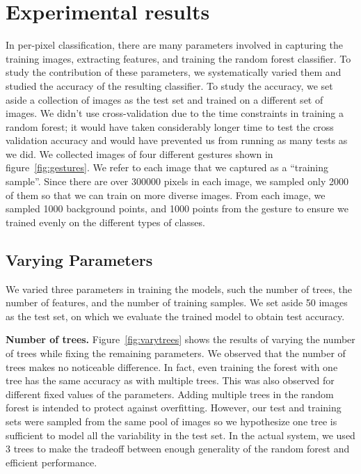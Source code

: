 \section{Experimental results}
\cutsection
\label{sec: experiments}

In per-pixel classification, there are many parameters involved in capturing the training images, extracting features, and training the random forest classifier. To study the contribution of these parameters, we systematically varied them and studied the accuracy of the resulting classifier. To study the accuracy, we set aside a collection of images as the test set and trained on a different set of images. We didn't use cross-validation due to the time constraints in training a random forest; it would have taken considerably longer time to test the cross validation accuracy and would  have prevented us from running as many tests as we did.
We collected images of four different gestures shown in figure~\ref{fig:gestures}. We refer to each image that we captured as a ``training sample''. Since there are over 300000 pixels in each image, we sampled only 2000 of them so that we can train on more diverse images. From each image, we sampled 1000 background points, and 1000 points from the gesture to ensure we trained evenly on the different types of classes.
\cutsubsection
\subsection{Varying Parameters} 
\cutsubsection
We varied three parameters in training the models, such the number of trees, the number of features, and the number of training samples. We set aside 50 images as the test set, on which we evaluate the trained model to obtain test accuracy. 
\cutequation

\textbf{Number of trees.} Figure~\ref{fig:varytrees} shows the results of varying the number of trees while fixing the remaining parameters. We observed that the number of trees makes no noticeable difference. In fact, even training the forest with one tree has the same accuracy as with multiple trees. This was also observed for different fixed values of the parameters. Adding multiple trees in the random forest is intended to protect against overfitting. However, our test and training sets were sampled from the same pool of images so we hypothesize one tree is sufficient to model all the variability in the test set. In the actual system, we used 3 trees to make the tradeoff between enough generality of the random forest and efficient performance. 
\cutequation

